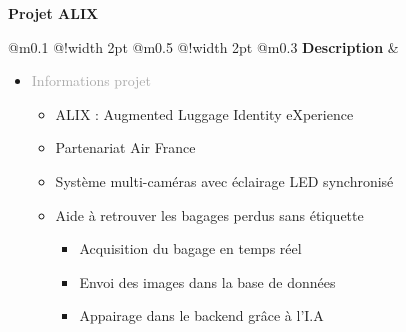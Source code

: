 \documentclass{article}
\begin{document}
\vspace*{0cm} %

\vfill %

\begin{center}
    \textcolor{secondaryBlue}{\textbf{Projet ALIX}}
\end{center}


\begin{tabular}
    {
        @{}m{}
        @{\hspace{0.001\textwidth}}!{\color{secondaryBlue}\vline width 2pt}
        @{}m{0.5\textwidth}
        @{\hspace{0.025\textwidth}}!{\color{secondaryBlue}\vline width 2pt}
        @{}m{0.3\textwidth}
    }
    \textcolor{secondaryBlue}{\textbf{Description}}           
    &
    \begin{itemize}[label={}, topsep=8pt, partopsep=0pt, itemsep=0.5pt, parsep=2pt, after=\vspace*{-\baselineskip}]
        \setlength{\itemsep}{10pt} 
        \item \textcolor{darkGray}{Informations projet}
        \begin{itemize}[label={\textcolor{gray!100}{\checkmark}}, topsep=8pt, partopsep=0pt, itemsep=0.5pt, parsep=2pt] 
            \item \textcolor{gray!100}{ALIX : Augmented Luggage Identity eXperience}
            \item \textcolor{gray!100}{Partenariat Air France}
            \item \textcolor{gray!100}{Système multi-caméras avec éclairage LED synchronisé}
            \item \textcolor{gray!100}{Aide à retrouver les bagages perdus sans étiquette}
            \begin{itemize}
                [label={\textcolor{gray!100}{$\triangleright$}}, topsep=0pt, partopsep=0pt, itemsep=0.5pt, parsep=2pt] 
                \item \textcolor{gray!100}{Acquisition du bagage en temps réel}
                \item \textcolor{gray!100}{Envoi des images dans la base de données}
                \item \textcolor{gray!100}{Appairage dans le backend grâce à l'I.A}
            \end{itemize}
        \end{itemize}
    \end{itemize}

\end{tabular}
\end{document}
